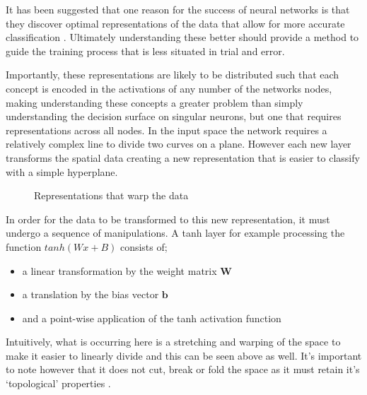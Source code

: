 \documentclass[a4paper,11pt,titlepage]{article}
\begin{document}
		It has been suggested that one reason for the success of neural networks is that they discover optimal representations of the data that allow for more accurate classification \cite{Hinton1986}. Ultimately understanding these better should provide a method to guide the training process that is less situated in trial and error.
		\par
		 Importantly, these representations are likely to be distributed \cite{Hinton1986} such that each concept is encoded in the activations of any number of the networks nodes, making understanding these concepts a greater problem than simply understanding the decision surface on singular neurons, but one that requires representations across all nodes.
	In the input space the network requires a relatively complex line to divide two curves on a plane. However each new layer transforms the spatial data creating a new representation that is easier to classify with a simple hyperplane.
				
		\begin{figure}[H]
    			\centering	
    			\qquad
    			\caption{Representations that warp the data}%
		\end{figure}		
		
		\par 
		In order for the data to be transformed to this new representation, it must undergo a sequence of manipulations. A tanh layer for example processing the function $ tanh(Wx + B) $ consists of; 
		\begin{itemize}
			\item a linear transformation by the weight matrix $ \bm{W} $
			\item a translation by the bias vector $ \bm{b} $
			\item and a point-wise application of the tanh activation function
		\end{itemize}
		Intuitively, what is occurring here is a stretching and warping of the space to make it easier to linearly divide and this can be seen above as well. It's important to note however that it does not cut, break or fold the space as it must retain it's `topological' properties \cite{Choi2005}.
		\par 
								
\end{document}
